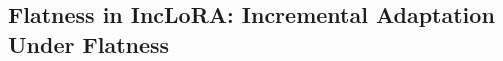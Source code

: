 \documentclass[letterpaper]{article} %
\begin{document}














\subsection{Flatness in IncLoRA: Incremental Adaptation Under Flatness}
\end{document}
